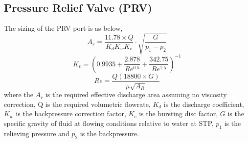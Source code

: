 \subsection{Pressure Relief Valve (PRV)}
\label{app:PRV}
The sizing of the PRV port is as below,
\begin{equation}
    A_r = \frac{11.78 \times Q}{K_d K_w K_c} \cdot \sqrt{\frac{G}{p_1-p_2}}
\end{equation}
\begin{equation}
    K_v = (0.9935 + \frac{2.878}{Re^{0.5}} + \frac{342.75}{Re^{1.5}})^{-1}
\end{equation}
\begin{equation}
    Re = \frac{Q(18800 \times G)}{\mu \sqrt{A_R}}
\end{equation}
where the $A_r$ is the required effective discharge area assuming no viscosity correction, Q is the required volumetric flowrate, $K_d$ is the discharge coefficient, $K_w$ is the backpressure correction factor, $K_c$ is the bursting disc factor, $G$ is the specific gravity of fluid at flowing conditions relative to water at STP, $p_1$ is the relieving pressure and $p_2$ is the backpressure. 



